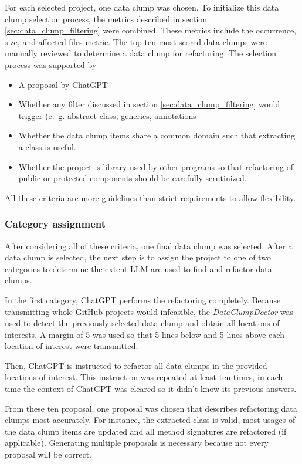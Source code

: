 For each selected project, one data clump was chosen. To initialize this data clump selection process, the metrics described in section \ref{sec:data_clump_filtering} were combined. These metrics include the occurrence, size, and affected files metric. The top ten most-scored data clumps were manually reviewed to determine a data clump for refactoring. The selection process was supported by 
\begin{itemize}
\item A proposal by ChatGPT 
    \item Whether any filter discussed in section \ref{sec:data_clump_filtering} would trigger (e.~g. abstract class, generics, annotations
    \item Whether the data clump items share a common domain such that extracting a class is useful. 
    \item Whether the project is library used by other programs so that refactoring of public or protected components should be carefully scrutinized. 
\end{itemize}

All these criteria are more guidelines than strict requirements to allow flexibility.

\subsubsection{Category assignment}

After considering all of these criteria, one final data clump was selected.
After a data clump is selected, the next step is to assign the project to one of two categories to determine the extent \acs{LLM} are used to find and refactor data clumps. 



In the first category, ChatGPT performs the refactoring completely. Because transmitting whole GitHub projects would infeasible, the \textit{DataClumpDoctor} was used to detect the previously selected data clump and obtain all locations of interests. A margin of 5 was used so that 5 lines below and 5 lines above each location of interest were transmitted. 

Then, ChatGPT is instructed to refactor all data clumps in the provided locations of interest. This instruction was repeated at least ten times, in each time the context of ChatGPT was cleared so it didn't know its previous answers. 

From these ten proposal, one proposal was chosen that describes refactoring data clumps most accurately. For instance, the extracted class is valid, most usages of the data clump items are updated and all method signatures are refactored (if applicable). Generating multiple proposals is necessary because not every proposal will be correct.




